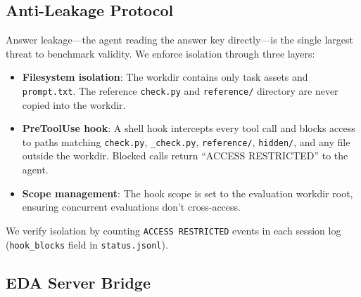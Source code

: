 \subsection{Anti-Leakage Protocol}
\label{sec:anti-leakage}

Answer leakage---the agent reading the answer key directly---is the single largest threat to benchmark validity. We enforce isolation through three layers:

\begin{itemize}
    \item \textbf{Filesystem isolation}: The workdir contains only task assets and \texttt{prompt.txt}. The reference \texttt{check.py} and \texttt{reference/} directory are never copied into the workdir.
    \item \textbf{PreToolUse hook}: A shell hook intercepts every tool call and blocks access to paths matching \texttt{check.py}, \texttt{\_check.py}, \texttt{reference/}, \texttt{hidden/}, and any file outside the workdir. Blocked calls return ``ACCESS RESTRICTED'' to the agent.
    \item \textbf{Scope management}: The hook scope is set to the evaluation workdir root, ensuring concurrent evaluations don't cross-access.
\end{itemize}

We verify isolation by counting \texttt{ACCESS RESTRICTED} events in each session log (\texttt{hook\_blocks} field in \texttt{status.jsonl}).

\subsection{EDA Server Bridge}
\label{sec:eda-bridge}


